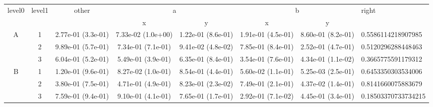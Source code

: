 \begin{tabular}{cccccccl}
\toprule
\multirow{2}{*}{level0} & \multirow{2}{*}{level1}& \multirow{2}{*}{other}&\multicolumn{2}{c}{a}&\multicolumn{2}{c}{b}& \multirow{2}{*}{right}\tabularnewline
\cmidrule(lr){4-5}
\cmidrule(lr){6-7}
&&&x&y&x&y\tabularnewline
\midrule
\multirow{3}{*}{A}&1& 2.77e-01 (3.3e-01)& 7.33e-02 (1.0e+00)& 1.22e-01 (8.6e-01)& 1.91e-01 (4.5e-01)& 8.60e-01 (8.2e-01)& 0.5586114218907985\tabularnewline
&2& 9.89e-01 (5.7e-01)& 7.34e-01 (7.1e-01)& 9.41e-02 (4.8e-02)& 7.85e-01 (8.4e-01)& 2.52e-01 (4.7e-01)& 0.5120296288448463\tabularnewline
&3& 6.04e-01 (5.2e-01)& 5.49e-01 (3.9e-01)& 6.35e-01 (8.4e-01)& 3.54e-01 (7.6e-01)& 4.34e-01 (1.1e-02)& 0.3665775591179312\tabularnewline
\midrule
\multirow{3}{*}{B}&1& 1.20e-01 (9.6e-01)& 8.27e-02 (1.0e-01)& 8.54e-01 (4.4e-01)& 5.60e-02 (1.1e-01)& 5.25e-03 (2.5e-01)& 0.6453350303534006\tabularnewline
&2& 3.80e-01 (7.5e-01)& 4.71e-01 (4.9e-01)& 8.23e-01 (2.3e-02)& 7.49e-01 (2.1e-01)& 4.37e-02 (1.4e-01)& 0.8141660075883679\tabularnewline
&3& 7.59e-01 (9.4e-01)& 9.10e-01 (4.1e-01)& 7.65e-01 (1.7e-01)& 2.92e-01 (7.1e-02)& 4.45e-01 (3.4e-01)& 0.18503370733734215\tabularnewline
\bottomrule
\end{tabular}
